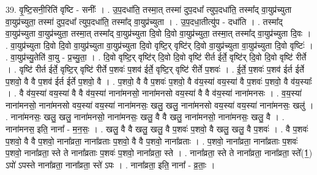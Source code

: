 \documentclass[17pt]{extarticle}
\begin{document}
39. वृ॒ष्टि॒सनी॒रिति॑ वृष्टि - सनीः᳚ । . उ॒प॒दधा॑ति॒ तस्मा॒त् तस्मा॑ दुप॒दधा᳚ त्युप॒दधा॑ति॒ तस्मा᳚द् वा॒युप्र॑च्युता वा॒युप्र॑च्युता॒ तस्मा॑ दुप॒दधा᳚ त्युप॒दधा॑ति॒ तस्मा᳚द् वा॒युप्र॑च्युता । . उ॒प॒दधा॒तीत्यु॑प - दधा॑ति । . तस्मा᳚द् वा॒युप्र॑च्युता वा॒युप्र॑च्युता॒ तस्मा॒त् तस्मा᳚द् वा॒युप्र॑च्युता दि॒वो दि॒वो वा॒युप्र॑च्युता॒ तस्मा॒त् तस्मा᳚द् वा॒युप्र॑च्युता दि॒वः । . वा॒युप्र॑च्युता दि॒वो दि॒वो वा॒युप्र॑च्युता वा॒युप्र॑च्युता दि॒वो वृष्टि॒र् वृष्टि॑र् दि॒वो वा॒युप्र॑च्युता वा॒युप्र॑च्युता दि॒वो वृष्टिः॑ । . वा॒युप्र॑च्यु॒तेति॑ वा॒यु - प्र॒च्यु॒ता॒ । . दि॒वो वृष्टि॒र् वृष्टि॑र् दि॒वो दि॒वो वृष्टि॑ रीर्त ईर्ते॒ वृष्टि॑र् दि॒वो दि॒वो वृष्टि॑ रीर्ते । . वृष्टि॑ रीर्त ईर्ते॒ वृष्टि॒र् वृष्टि॑ रीर्ते प॒शवः॑ प॒शव॑ ईर्ते॒ वृष्टि॒र् वृष्टि॑ रीर्ते प॒शवः॑ । . ई॒र्ते॒ प॒शवः॑ प॒शव॑ ईर्त ईर्ते प॒शवो॒ वै वै प॒शव॑ ईर्त ईर्ते प॒शवो॒ वै । . प॒शवो॒ वै वै प॒शवः॑ प॒शवो॒ वै व॑य॒स्या॑ वय॒स्या॑ वै प॒शवः॑ प॒शवो॒ वै व॑य॒स्याः᳚ । . वै व॑य॒स्या॑ वय॒स्या॑ वै वै व॑य॒स्या॑ नाना॑मनसो॒ नाना॑मनसो वय॒स्या॑ वै वै व॑य॒स्या॑ नाना॑मनसः । . व॒य॒स्या॑ नाना॑मनसो॒ नाना॑मनसो वय॒स्या॑ वय॒स्या॑ नाना॑मनसः॒ खलु॒ खलु॒ नाना॑मनसो वय॒स्या॑ वय॒स्या॑ नाना॑मनसः॒ खलु॑ । . नाना॑मनसः॒ खलु॒ खलु॒ नाना॑मनसो॒ नाना॑मनसः॒ खलु॒ वै वै खलु॒ नाना॑मनसो॒ नाना॑मनसः॒ खलु॒ वै । . नाना॑मनस॒ इति॒ नाना᳚ - म॒न॒सः॒ । . खलु॒ वै वै खलु॒ खलु॒ वै प॒शवः॑ प॒शवो॒ वै खलु॒ खलु॒ वै प॒शवः॑ । . वै प॒शवः॑ प॒शवो॒ वै वै प॒शवो॒ नाना᳚व्रता॒ नाना᳚व्रताः प॒शवो॒ वै वै प॒शवो॒ नाना᳚व्रताः । . प॒शवो॒ नाना᳚व्रता॒ नाना᳚व्रताः प॒शवः॑ प॒शवो॒ नाना᳚व्रता॒ स्ते ते नाना᳚व्रताः प॒शवः॑ प॒शवो॒ नाना᳚व्रता॒ स्ते । . नाना᳚व्रता॒ स्ते ते नाना᳚व्रता॒ नाना᳚व्रता॒ स्ते᳚(1॒) ऽपो॑ ऽपस्ते नाना᳚व्रता॒ नाना᳚व्रता॒ स्ते॑ ऽपः । . नाना᳚व्रता॒ इति॒ नाना᳚ - व्र॒ताः॒ । \newline
\end{document}
